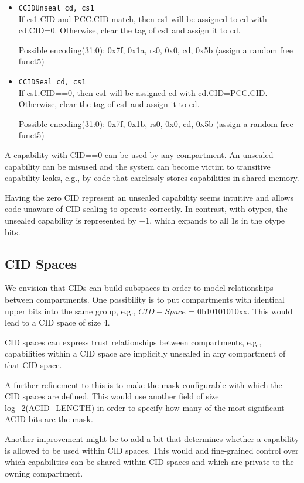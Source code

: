 \begin{itemize}
\item \texttt{CCIDUnseal cd, cs1}\\
If cs1.CID and PCC.CID match, then cs1 will be assigned to cd with cd.CID=0. Otherwise, clear the tag of cs1 and assign it to cd.

Possible encoding(31:0): 0x7f, 0x1a, rs0, 0x0, cd, 0x5b (assign a random free funct5)

\item \texttt{CCIDSeal cd, cs1}\\
If cs1.CID==0, then cs1 will be assigned cd with cd.CID=PCC.CID. Otherwise, clear the tag of cs1 and assign it to cd.

Possible encoding(31:0): 0x7f, 0x1b, rs0, 0x0, cd, 0x5b (assign a random free funct5)
\end{itemize}

A capability with CID==0 can be used by any compartment.
An unsealed capability can be misused and the system can become victim to transitive capability leaks, e.g., by code that carelessly stores capabilities in shared memory.

Having the zero CID represent an unsealed capability seems intuitive and allows code unaware of CID sealing to operate correctly.
In contrast, with otypes, the unsealed capability is represented by $-1$, which expands to all 1s in the otype bits.

\subsection{CID Spaces}
\label{app:exp:subsec:cid_spaces}

We envision that CIDs can build subspaces in order to model relationships between compartments.
One possibility is to put compartments with identical upper bits into the same group, e.g., $CID-Space$ = 0b10101010xx.
This would lead to a CID space of size 4.

CID spaces can express trust relationships between compartments, e.g., capabilities within a CID space are implicitly unsealed in any compartment of that CID space.

A further refinement to this is to make the mask configurable with which the CID spaces are defined.
This would use another field of size log\_2(ACID\_LENGTH) in order to specify how many of the most significant ACID bits are the mask.

Another improvement might be to add a bit that determines whether a capability is allowed to be used within CID spaces.
This would add fine-grained control over which capabilities can be shared within CID spaces and which are private to the owning compartment.

